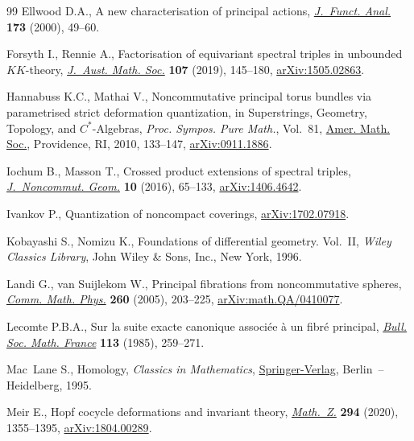 \documentclass[10pt,a4paper]{amsart}
\numberwithin{equation}{section}
\begin{document}
\begin{thebibliography}{99}
Ellwood D.A., A new characterisation of principal actions, \href{https://doi.org/10.1006/jfan.2000.3561}{\textit{J.~Funct.
 Anal.}} \textbf{173} (2000), 49--60.

Forsyth I., Rennie A., Factorisation of equivariant spectral triples in
 unbounded {$KK$}-theory, \href{https://doi.org/10.1017/s1446788718000423}{\textit{J.~Aust. Math. Soc.}} \textbf{107} (2019),
 145--180, \href{https://arxiv.org/abs/1505.02863}{arXiv:1505.02863}.

Hannabuss K.C., Mathai V., Noncommutative principal torus bundles via
 parametrised strict deformation quantization, in Superstrings, Geometry,
 Topology, and {$C^\ast$}-Algebras, \textit{Proc. Sympos. Pure Math.},
 Vol.~81, \href{https://doi.org/10.1090/pspum/081/2681761}{Amer. Math. Soc.}, Providence, RI, 2010, 133--147,
 \href{https://arxiv.org/abs/0911.1886}{arXiv:0911.1886}.

Iochum B., Masson T., Crossed product extensions of spectral triples,
 \href{https://doi.org/10.4171/JNCG/229}{\textit{J.~Noncommut. Geom.}} \textbf{10} (2016), 65--133, \href{https://arxiv.org/abs/1406.4642}{arXiv:1406.4642}.

Ivankov P., Quantization of noncompact coverings, \href{https://arxiv.org/abs/1702.07918}{arXiv:1702.07918}.

Kobayashi S., Nomizu K., Foundations of differential geometry. {V}ol.~{II},
 \textit{Wiley Classics Library}, John Wiley \& Sons, Inc., New York, 1996.

Landi G., van Suijlekom W., Principal fibrations from noncommutative spheres,
 \href{https://doi.org/10.1007/s00220-005-1377-7}{\textit{Comm. Math. Phys.}} \textbf{260} (2005), 203--225,
 \href{https://arxiv.org/abs/math.QA/0410077}{arXiv:math.QA/0410077}.

Lecomte P.B.A., Sur la suite exacte canonique associ\'ee \`a un fibr\'e
 principal, \href{https://doi.org/10.24033/bsmf.2032}{\textit{Bull. Soc. Math. France}} \textbf{113} (1985), 259--271.

Mac~Lane S., Homology, \textit{Classics in Mathematics}, \href{https://doi.org/10.1007/978-3-642-62029-4}{Springer-Verlag}, Berlin~--
 Heidelberg, 1995.

Meir E., Hopf cocycle deformations and invariant theory, \href{https://doi.org/10.1007/s00209-019-02326-5}{\textit{Math.~Z.}}
 \textbf{294} (2020), 1355--1395, \href{https://arxiv.org/abs/1804.00289}{arXiv:1804.00289}.


\end{thebibliography}
\end{document}
